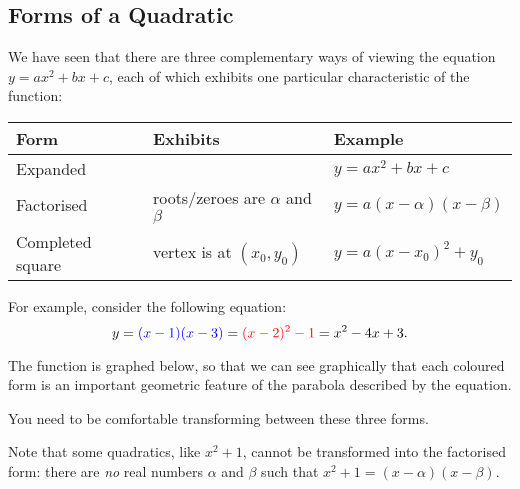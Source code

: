 \subsection*{Forms of a Quadratic}
We have seen that there are three complementary ways of viewing the equation $ y = ax^2 + bx + c $, each of which
exhibits one particular characteristic of the function:
\begin{center}
  \begin{tabular}{l|l|l}
    \textbf{Form} & \textbf{Exhibits} & \textbf{Example}\\\hline
    Expanded &  & $ y = ax^2 + bx + c $ \\
    Factorised & roots/zeroes are $ \alpha $ and $ \beta $ & $ y = a(x - \alpha)(x - \beta)$ \\
    Completed square & vertex is at $ (x_0, y_0) $ & $ y = a(x - x_0)^2 + y_0 $
  \end{tabular}
\end{center}

For example, consider the following equation:
\begin{displaymath}
  y = {\color{blue}(x - 1)(x - 3)} = {\color{red}(x - 2)^2 - 1} = x^2 - 4x + 3.
\end{displaymath}

The function is graphed below, so that we can see graphically that each coloured form is
an important geometric feature of the parabola described by the equation.

\begin{center}
\end{center}

You need to be comfortable transforming between these three forms.

Note that some quadratics, like $ x^2 + 1 $, cannot be transformed into the factorised form: there
are \emph{no} real numbers $ \alpha $ and $ \beta $ such that $ x^2 + 1 = (x - \alpha)(x - \beta) $.

